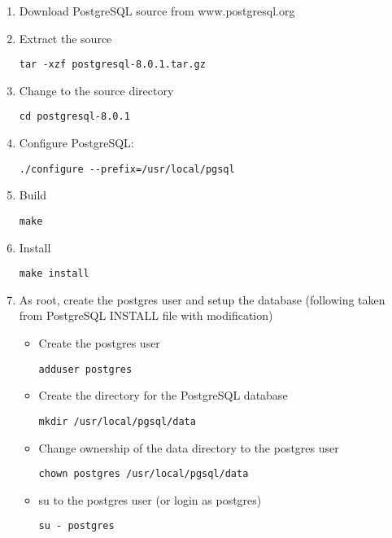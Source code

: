 \begin{enumerate}
\item Download PostgreSQL source from www.postgresql.org \cite{Postgreweb} 
\item Extract the source 
\begin{verbatim}
tar -xzf postgresql-8.0.1.tar.gz
\end{verbatim}

\item Change to the source directory 
\begin{verbatim}
cd postgresql-8.0.1
\end{verbatim}

\item Configure PostgreSQL:
\begin{verbatim}
./configure --prefix=/usr/local/pgsql 
\end{verbatim}

\item Build
\begin{verbatim}
make
\end{verbatim}

\item Install
\begin{verbatim}
make install
\end{verbatim}

\item As root, create the postgres user and setup the database (following
taken from PostgreSQL INSTALL file with modification)
\begin{itemize} 
\item Create the postgres user 
\begin{verbatim}
adduser postgres
\end{verbatim}

\item Create the directory for the PostgreSQL database 
\begin{verbatim}
mkdir /usr/local/pgsql/data
\end{verbatim}

\item Change ownership of the data directory to the postgres user
\begin{verbatim}
chown postgres /usr/local/pgsql/data
\end{verbatim}

\item su to the postgres user (or login as postgres)
\begin{verbatim}
su - postgres
\end{verbatim}


\end{itemize}
\end{enumerate}
